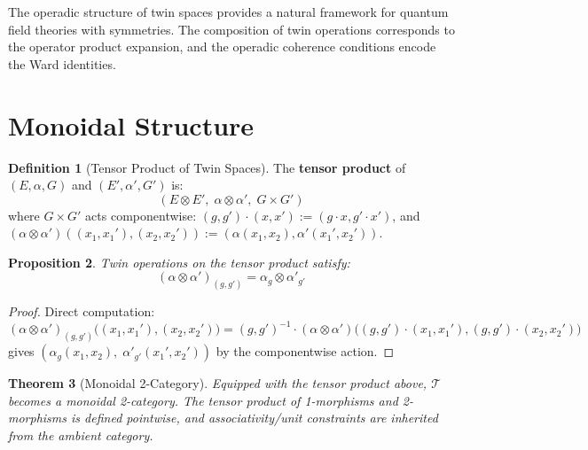 \documentclass[11pt,a4paper,openany]{book}
\theoremstyle{plain}
\newtheorem{theorem}{Theorem}[chapter]
\newtheorem{proposition}[theorem]{Proposition}
\theoremstyle{definition}
\newtheorem{definition}[theorem]{Definition}
\newcommand{\actspace}{E}
\newcommand{\groupG}{G}
\begin{document}
\begin{applicationbox}
The operadic structure of twin spaces provides a natural framework for quantum field theories with symmetries. The composition of twin operations corresponds to the operator product expansion, and the operadic coherence conditions encode the Ward identities.
\end{applicationbox}

\section{Monoidal Structure}

\begin{definition}[Tensor Product of Twin Spaces]\label{def:tensor-twin}
The \textbf{tensor product} of $(\actspace, \alpha, \groupG)$ and $(\actspace', \alpha', \groupG')$ is:
\[
(\actspace \otimes \actspace', \;\alpha \otimes \alpha', \;\groupG \times \groupG')
\]
where $\groupG \times \groupG'$ acts componentwise: $(g, g') \cdot (x, x') := (g \cdot x, g' \cdot x')$, and $(\alpha \otimes \alpha')((x_1, x_1'), (x_2, x_2')) := (\alpha(x_1, x_2), \alpha'(x_1', x_2'))$.
\end{definition}

\begin{proposition}\label{prop:tensor-twin-ops}
Twin operations on the tensor product satisfy:
\[
(\alpha \otimes \alpha')_{(g, g')} = \alpha_g \otimes \alpha'_{g'}
\]
\end{proposition}

\begin{proof}
Direct computation:
\[
(\alpha \otimes \alpha')_{(g,g')}\big((x_1, x_1'), (x_2, x_2')\big) = (g, g')^{-1} \cdot (\alpha \otimes \alpha')\big((g, g') \cdot (x_1, x_1'), (g, g') \cdot (x_2, x_2')\big)
\]
gives $(\alpha_g(x_1, x_2), \;\alpha'_{g'}(x_1', x_2'))$ by the componentwise action.
\end{proof}

\begin{theorem}[Monoidal 2-Category]\label{thm:monoidal-2cat}
Equipped with the tensor product above, $\mathcal{T}$ becomes a monoidal 2-category. The tensor product of 1-morphisms and 2-morphisms is defined pointwise, and associativity/unit constraints are inherited from the ambient category.
\end{theorem}
\end{document}

